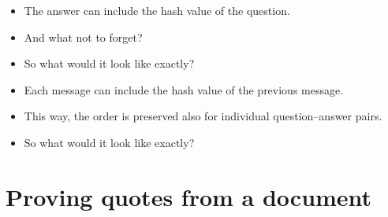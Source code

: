 \begin{frame}
  \begin{solution}
    \begin{itemize}
      \item The answer can include the hash value of the question.
    \end{itemize}
  \end{solution}

  \begin{question}
    \begin{itemize}
      \item And what not to forget?
      \item So what would it look like exactly?
    \end{itemize}
  \end{question}
\end{frame}

\begin{frame}
  \begin{solution}
    \begin{itemize}
      \item Each message can include the hash value of the previous message.
      \item This way, the order is preserved also for individual 
        question--answer pairs.
    \end{itemize}
  \end{solution}

  \begin{question}
    \begin{itemize}
      \item So what would it look like exactly?
    \end{itemize}
  \end{question}
\end{frame}

\section{Proving quotes from a document}

